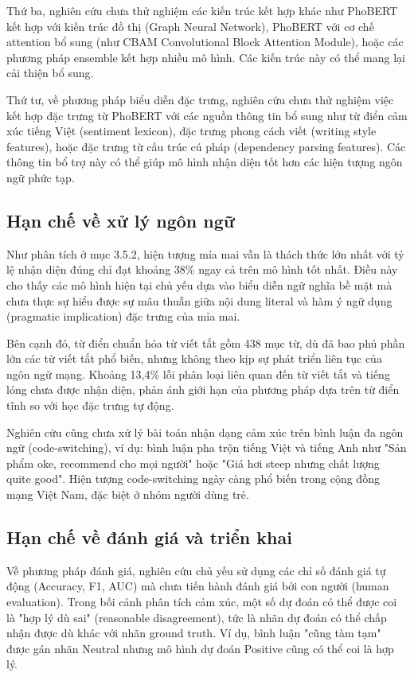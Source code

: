 \documentclass[14pt, a4paper]{report}
\begin{document}
Thứ ba, nghiên cứu chưa thử nghiệm các kiến trúc kết hợp khác như PhoBERT kết hợp với kiến trúc đồ thị (Graph Neural Network), PhoBERT với cơ chế attention bổ sung (như CBAM \- Convolutional Block Attention Module), hoặc các phương pháp ensemble kết hợp nhiều mô hình. Các kiến trúc này có thể mang lại cải thiện bổ sung.


Thứ tư, về phương pháp biểu diễn đặc trưng, nghiên cứu chưa thử nghiệm việc kết hợp đặc trưng từ PhoBERT với các nguồn thông tin bổ sung như từ điển cảm xúc tiếng Việt (sentiment lexicon), đặc trưng phong cách viết (writing style features), hoặc đặc trưng từ cấu trúc cú pháp (dependency parsing features). Các thông tin bổ trợ này có thể giúp mô hình nhận diện tốt hơn các hiện tượng ngôn ngữ phức tạp.


\subsection{Hạn chế về xử lý ngôn ngữ}


Như phân tích ở mục 3.5.2, hiện tượng mỉa mai vẫn là thách thức lớn nhất với tỷ lệ nhận diện đúng chỉ đạt khoảng 38\% ngay cả trên mô hình tốt nhất. Điều này cho thấy các mô hình hiện tại chủ yếu dựa vào biểu diễn ngữ nghĩa bề mặt mà chưa thực sự hiểu được sự mâu thuẫn giữa nội dung literal và hàm ý ngữ dụng (pragmatic implication) đặc trưng của mỉa mai.


Bên cạnh đó, từ điển chuẩn hóa từ viết tắt gồm 438 mục từ, dù đã bao phủ phần lớn các từ viết tắt phổ biến, nhưng không theo kịp sự phát triển liên tục của ngôn ngữ mạng. Khoảng 13,4\% lỗi phân loại liên quan đến từ viết tắt và tiếng lóng chưa được nhận diện, phản ánh giới hạn của phương pháp dựa trên từ điển tĩnh so với học đặc trưng tự động.


Nghiên cứu cũng chưa xử lý bài toán nhận dạng cảm xúc trên bình luận đa ngôn ngữ (code-switching), ví dụ: bình luận pha trộn tiếng Việt và tiếng Anh như "Sản phẩm oke, recommend cho mọi người" hoặc "Giá hơi steep nhưng chất lượng quite good". Hiện tượng code-switching ngày càng phổ biến trong cộng đồng mạng Việt Nam, đặc biệt ở nhóm người dùng trẻ.


\subsection{Hạn chế về đánh giá và triển khai}


Về phương pháp đánh giá, nghiên cứu chủ yếu sử dụng các chỉ số đánh giá tự động (Accuracy, F1, AUC) mà chưa tiến hành đánh giá bởi con người (human evaluation). Trong bối cảnh phân tích cảm xúc, một số dự đoán có thể được coi là "hợp lý dù sai" (reasonable disagreement), tức là nhãn dự đoán có thể chấp nhận được dù khác với nhãn ground truth. Ví dụ, bình luận "cũng tàm tạm" được gán nhãn Neutral nhưng mô hình dự đoán Positive cũng có thể coi là hợp lý.
\end{document}
